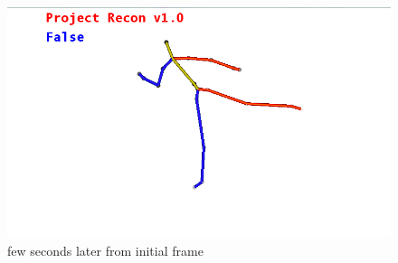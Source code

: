 \\
\begin{figure}[ht]
\centering
\includegraphics[scale=1]{images/skeleton_frame2.png}
\caption{few seconds later from initial frame}
\label{4.2}
\end{figure}

